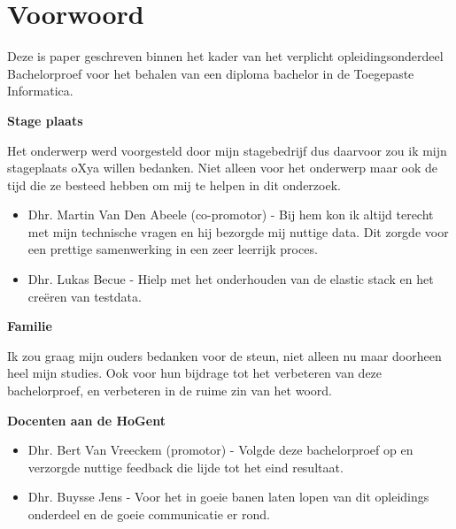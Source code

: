 
\chapter*{Voorwoord}
\label{ch:voorwoord}
Deze is paper geschreven binnen het kader van het verplicht opleidingsonderdeel Bachelorproef voor het behalen van een diploma bachelor in de Toegepaste Informatica.

\textbf{Stage plaats}

Het onderwerp werd voorgesteld door mijn stagebedrijf dus daarvoor zou ik mijn stageplaats oXya willen bedanken. Niet alleen voor het onderwerp maar ook de tijd die ze besteed hebben om mij te helpen in dit onderzoek. 
\begin{itemize}
	\item Dhr. Martin Van Den Abeele (co-promotor) - Bij hem kon ik altijd terecht met mijn technische vragen en hij bezorgde mij nuttige data. Dit zorgde voor een prettige samenwerking in een zeer leerrijk proces.
   
   
   \item Dhr. Lukas Becue - Hielp met het onderhouden van de elastic stack en het creëren van testdata.
\end{itemize}

\textbf{Familie}

Ik zou graag mijn ouders bedanken voor de steun, niet alleen nu maar doorheen heel mijn studies.
Ook voor hun bijdrage tot het verbeteren van deze bachelorproef, en verbeteren in de ruime zin van het woord.

\textbf{Docenten aan de HoGent}
	\begin{itemize}
	\item Dhr. Bert Van Vreeckem (promotor) - Volgde deze bachelorproef op en verzorgde nuttige feedback die lijde tot het eind resultaat.
   
   
   \item Dhr. Buysse Jens - Voor het in goeie banen laten lopen van dit opleidings onderdeel en de goeie communicatie er rond.
\end{itemize}

